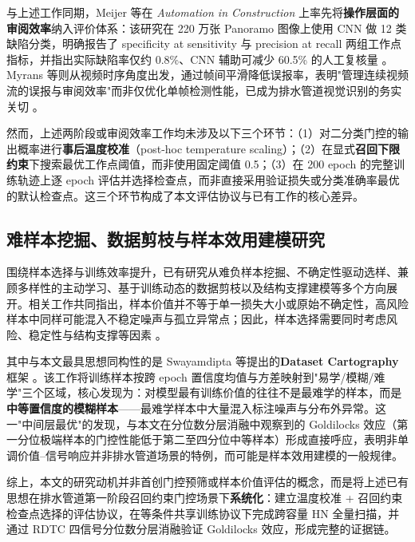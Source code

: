 \documentclass[UTF8,openany,12pt]{ctexbook}
\begin{document}
与上述工作同期，Meijer 等在 \textit{Automation in Construction} 上率先将\textbf{操作层面的审阅效率}纳入评价体系：该研究在 220 万张 Panoramo 图像上使用 CNN 做 12 类缺陷分类，明确报告了 specificity at sensitivity 与 precision at recall 两组工作点指标，并指出实际缺陷率仅约 0.8\%、CNN 辅助可减少 60.5\% 的人工复核量 \cite{meijer2019defect}。Myrans 等则从视频时序角度出发，通过帧间平滑降低误报率，表明"管理连续视频流的误报与审阅效率"而非仅优化单帧检测性能，已成为排水管道视觉识别的务实关切 \cite{myrans2019automated}。

然而，上述两阶段或审阅效率工作均未涉及以下三个环节：（1）对二分类门控的输出概率进行\textbf{事后温度校准}（post-hoc temperature scaling）\cite{guo2017calibration}；（2）在显式\textbf{召回下限约束}下搜索最优工作点阈值，而非使用固定阈值 0.5；（3）在 200 epoch 的完整训练轨迹上逐 epoch 评估并选择检查点，而非直接采用验证损失或分类准确率最优的默认检查点。这三个环节构成了本文评估协议与已有工作的核心差异。

\subsection{难样本挖掘、数据剪枝与样本效用建模研究}
围绕样本选择与训练效率提升，已有研究从难负样本挖掘、不确定性驱动选样、兼顾多样性的主动学习、基于训练动态的数据剪枝以及结构支撑建模等多个方向展开。相关工作共同指出，样本价值并不等于单一损失大小或原始不确定性，高风险样本中同样可能混入不稳定噪声与孤立异常点；因此，样本选择需要同时考虑风险、稳定性与结构支撑等因素 \cite{koh2017influence,ash2020badge,wu2022entropy,yang2024plug,kim2024structural,zhang2024tdds}。

其中与本文最具思想同构性的是 Swayamdipta 等提出的\textbf{Dataset Cartography} 框架 \cite{swayamdipta2020cartography}。该工作将训练样本按跨 epoch 置信度均值与方差映射到"易学/模糊/难学"三个区域，核心发现为：对模型最有训练价值的往往不是最难学的样本，而是\textbf{中等置信度的模糊样本}——最难学样本中大量混入标注噪声与分布外异常。这一"中间层最优"的发现，与本文在分位数分层消融中观察到的 Goldilocks 效应（第一分位极端样本的门控性能低于第二至四分位中等样本）形成直接呼应，表明非单调价值--信号响应并非排水管道场景的特例，而可能是样本效用建模的一般规律。

综上，本文的研究动机并非首创门控预筛或样本价值评估的概念，而是将上述已有思想在排水管道第一阶段召回约束门控场景下\textbf{系统化}：建立温度校准 + 召回约束检查点选择的评估协议，在等条件共享训练协议下完成跨容量 HN 全量扫描，并通过 RDTC 四信号分位数分层消融验证 Goldilocks 效应，形成完整的证据链。
\end{document}
